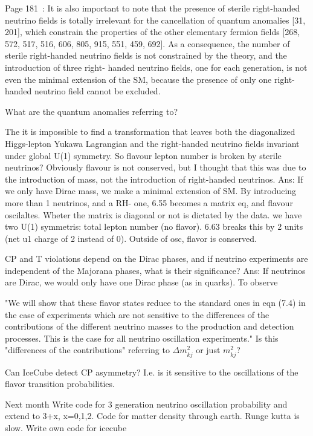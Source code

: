 \documentclass{article}
\begin{document}
Page 181~\cite{giunti}: It is also important to note that the presence of sterile right-handed neutrino
fields is totally irrelevant for the cancellation of quantum anomalies [31, 201], which
constrain the properties of the other elementary fermion fields [268, 572, 517, 516,
606, 805, 915, 551, 459, 692]. As a consequence, the number of sterile right-handed
neutrino fields is not constrained by the theory, and the introduction of three right-
handed neutrino fields, one for each generation, is not even the minimal extension
of the SM, because the presence of only one right-handed neutrino field cannot be
excluded.

What are the quantum anomalies referring to? 

The it is impossible to find a transformation that leaves both the diagonalized Higgs-lepton Yukawa Lagrangian and the right-handed neutrino fields invariant under global U(1) symmetry. So flavour lepton number is broken by sterile neutrinos? Obviously flavour is not conserved, but I thought that this was due to the introduction of mass, not the introduction of right-handed neutrinos.
Ans: If we only have Dirac mass, we make a minimal extension of SM. By introducing more than 1 neutrinos, and a RH- one, 6.55 becomes a matrix eq, and flavour oscilaltes. Wheter the matrix is diagonal or not is dictated by the data.
we have two U(1) symmetris: total lepton number (no flavor). 6.63 breaks this by 2 units (net u1 charge of 2 instead of 0). Outside of osc, flavor is conserved.


CP and T violations depend on the Dirac phases, and if neutrino experiments are independent of the Majorana phases, what is their significance?
Ans: If neutrinos are Dirac, we would only have one Dirac phase (as in quarks). To observe 

"We will show that these flavor states reduce to the standard ones in eqn (7.4) in the case of experiments which are not sensitive to the
differences of the contributions of the different neutrino masses to the production
and detection processes. This is the case for all neutrino oscillation experiments."
Is this "differences of the contributions" referring to $\Delta m_{kj}^2$ or just $m_{kj}^2$?

Can IceCube detect CP asymmetry? I.e. is it sensitive to the oscillations of the flavor transition probabilities.

Next month 
Write code for 3 generation neutrino oscillation probability and extend to 3+x, x=0,1,2. 
Code for matter density through earth. Runge kutta is slow. 
Write own code for icecube
\end{document}
